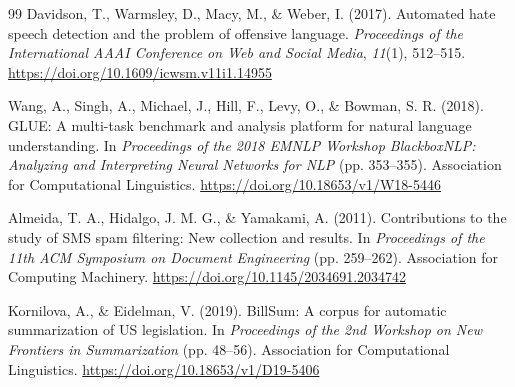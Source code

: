 \documentclass{BVP_AISC}
\begin{document}
\begin{thebibliography}{99}
 Davidson, T., Warmsley, D., Macy, M., \& Weber, I. (2017). Automated hate speech detection and the problem of offensive language. \textit{Proceedings of the International AAAI Conference on Web and Social Media}, \textit{11}(1), 512--515. \url{https://doi.org/10.1609/icwsm.v11i1.14955}

 Wang, A., Singh, A., Michael, J., Hill, F., Levy, O., \& Bowman, S. R. (2018). GLUE: A multi-task benchmark and analysis platform for natural language understanding. In \textit{Proceedings of the 2018 EMNLP Workshop BlackboxNLP: Analyzing and Interpreting Neural Networks for NLP} (pp. 353--355). Association for Computational Linguistics. \url{https://doi.org/10.18653/v1/W18-5446}

 Almeida, T. A., Hidalgo, J. M. G., \& Yamakami, A. (2011). Contributions to the study of SMS spam filtering: New collection and results. In \textit{Proceedings of the 11th ACM Symposium on Document Engineering} (pp. 259--262). Association for Computing Machinery. \url{https://doi.org/10.1145/2034691.2034742}

 Kornilova, A., \& Eidelman, V. (2019). BillSum: A corpus for automatic summarization of US legislation. In \textit{Proceedings of the 2nd Workshop on New Frontiers in Summarization} (pp. 48--56). Association for Computational Linguistics. \url{https://doi.org/10.18653/v1/D19-5406}

\end{thebibliography}
\end{document}
